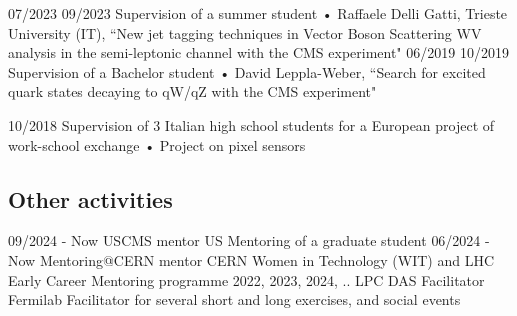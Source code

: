   \teaching
    {07/2023 \textemdash{} 09/2023}
    {Supervision of a summer student • }{Raffaele Delli Gatti, Trieste University (IT), ``New jet tagging techniques in Vector Boson Scattering WV analysis in the semi-leptonic channel with the CMS experiment"}
  \teaching
    {06/2019 \textemdash{} 10/2019}
    {Supervision of a Bachelor student • }{David Leppla-Weber, ``Search for excited quark states decaying to qW/qZ with the CMS experiment"}
      
  \teaching
    {10/2018}
    {Supervision of 3 Italian high school students for a European project of work-school exchange • }
    {Project on pixel sensors}


\subsection{Other activities}
	\position
      {09/2024 - Now } 
      {USCMS mentor}
      {US}
      {Mentoring of a graduate student}
	\position
      {06/2024 - Now } 
      {Mentoring@CERN mentor}
      {CERN}
      {Women in Technology (WIT) and LHC Early Career Mentoring programme}
	\position
      {2022, 2023, 2024, ..} 
      {LPC DAS Facilitator}
      {Fermilab}
      {Facilitator for several short and long exercises, and social events}
